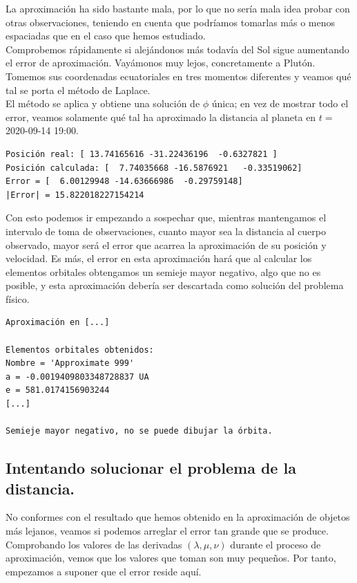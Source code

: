 La aproximación ha sido bastante mala, por lo que no sería mala idea probar con otras observaciones, teniendo en cuenta que podríamos tomarlas más o menos espaciadas que en el caso que hemos estudiado.\\

Comprobemos rápidamente si alejándonos más todavía del Sol sigue aumentando el error de aproximación. Vayámonos muy lejos, concretamente a Plutón. Tomemos sus coordenadas ecuatoriales en tres momentos diferentes y veamos qué tal se porta el método de Laplace.\\

El método se aplica y obtiene una solución de $\phi$ única; en vez de mostrar todo el error, veamos solamente qué tal ha aproximado la distancia al planeta en $t=$2020-09-14 19:00.

\begin{lstlisting}[style=Console]
Posición real: [ 13.74165616 -31.22436196  -0.6327821 ]
Posición calculada: [  7.74035668 -16.5876921   -0.33519062]
Error = [  6.00129948 -14.63666986  -0.29759148]
|Error| = 15.822018227154214
\end{lstlisting}

Con esto podemos ir empezando a sospechar que, mientras mantengamos el intervalo de toma de observaciones, cuanto mayor sea la distancia al cuerpo observado, mayor será el error que acarrea la aproximación de su posición y velocidad. Es más, el error en esta aproximación hará que al calcular los elementos orbitales obtengamos un semieje mayor negativo, algo que no es posible, y esta aproximación debería ser descartada como solución del problema físico.

\begin{lstlisting}[style=Console]
Aproximación en [...]

Elementos orbitales obtenidos:
Nombre = 'Approximate 999'
a = -0.0019409803348728837 UA
e = 581.0174156903244
[...]

Semieje mayor negativo, no se puede dibujar la órbita.
\end{lstlisting}

\subsection{Intentando solucionar el problema de la distancia.}
No conformes con el resultado que hemos obtenido en la aproximación de objetos más lejanos, veamos si podemos arreglar el error tan grande que se produce. Comprobando los valores de las derivadas $(\lambda,\mu,\nu)$ durante el proceso de aproximación, vemos que los valores que toman son muy pequeños. Por tanto, empezamos a suponer que el error reside aquí.\\

